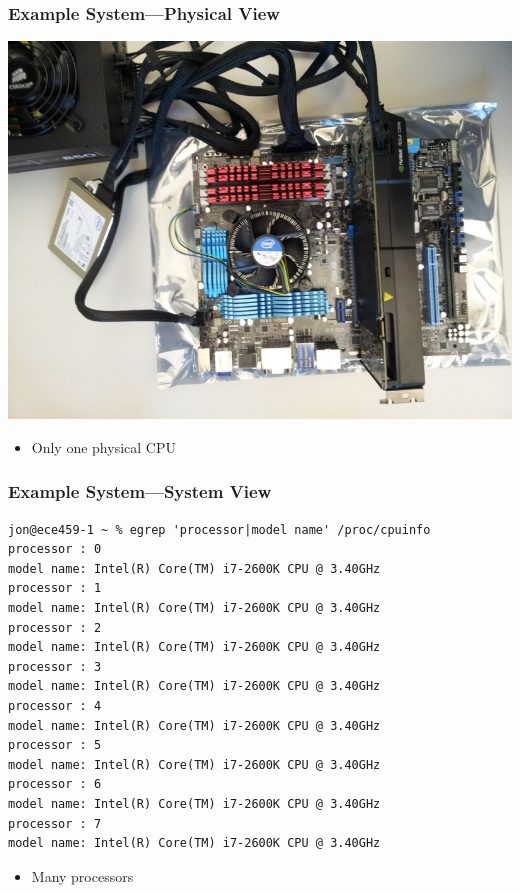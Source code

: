 \documentclass[aspectratio=43]{beamer}
\begin{document}
\begin{frame}[fragile]
  \frametitle{Example System---Physical View}
  
  \begin{center}
  \includegraphics[scale=0.25]{L03/computer-parts}
  \end{center}

  \begin{itemize}
    \item Only one physical CPU
  \end{itemize}
\end{frame}

\begin{frame}[fragile]
  \frametitle{Example System---System View}

  \scriptsize
  \begin{lstlisting}
jon@ece459-1 ~ % egrep 'processor|model name' /proc/cpuinfo 
processor : 0
model name: Intel(R) Core(TM) i7-2600K CPU @ 3.40GHz
processor : 1
model name: Intel(R) Core(TM) i7-2600K CPU @ 3.40GHz
processor : 2
model name: Intel(R) Core(TM) i7-2600K CPU @ 3.40GHz
processor : 3
model name: Intel(R) Core(TM) i7-2600K CPU @ 3.40GHz
processor : 4
model name: Intel(R) Core(TM) i7-2600K CPU @ 3.40GHz
processor : 5
model name: Intel(R) Core(TM) i7-2600K CPU @ 3.40GHz
processor : 6
model name: Intel(R) Core(TM) i7-2600K CPU @ 3.40GHz
processor : 7
model name: Intel(R) Core(TM) i7-2600K CPU @ 3.40GHz
  \end{lstlisting}

  \begin{itemize}
    \item Many processors
  \end{itemize}
\end{frame}
\end{document}
